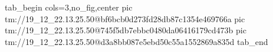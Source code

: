  
 
 
 
 

\qqSecOrig


\ifcmt
  tab_begin cols=3,no_fig,center
    pic tm://19_12_22.13.25.50@bf6bcb0d273fd28db87c1354e469766a
    pic tm://19_12_22.13.25.50@745f5db7ebbc0480da06416179cd473b
    pic tm://19_12_22.13.25.50@d3a8bb087e5ebd50c55a1552869a835d
  tab_end
\fi

